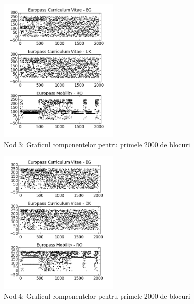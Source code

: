 \documentclass[oneside, 12pt]{book}
\begin{document}
\begin{figure}[t!]
\begin{center}
\includegraphics[width=0.53\textwidth]{img/db3.png}    %
\caption{Nod 3: Graficul componentelor pentru primele 2000 de blocuri} 
\label{fig:db3}
\end{center}
\end{figure}

\begin{figure}[t!]
\begin{center}
\includegraphics[width=0.53\textwidth]{img/db4.png}    %
\caption{Nod 4: Graficul componentelor pentru primele 2000 de blocuri} 
\label{fig:db4}
\end{center}
\end{figure}
\end{document}
